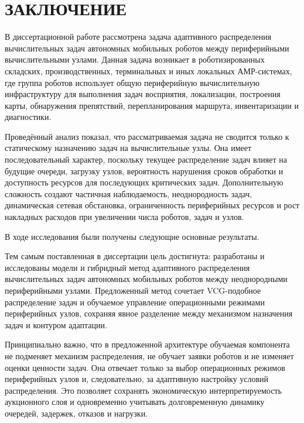 \chapter*{ЗАКЛЮЧЕНИЕ}


В диссертационной работе рассмотрена задача адаптивного распределения вычислительных задач автономных мобильных роботов между периферийными вычислительными узлами. Данная задача возникает в роботизированных складских, производственных, терминальных и иных локальных АМР-системах, где группа роботов использует общую периферийную вычислительную инфраструктуру для выполнения задач восприятия, локализации, построения карты, обнаружения препятствий, перепланирования маршрута, инвентаризации и диагностики.

Проведённый анализ показал, что рассматриваемая задача не сводится только к статическому назначению задач на вычислительные узлы. Она имеет последовательный характер, поскольку текущее распределение задач влияет на будущие очереди, загрузку узлов, вероятность нарушения сроков обработки и доступность ресурсов для последующих критических задач. Дополнительную сложность создают частичная наблюдаемость, неоднородность задач, динамическая сетевая обстановка, ограниченность периферийных ресурсов и рост накладных расходов при увеличении числа роботов, задач и узлов.

В ходе исследования были получены следующие основные результаты.



Тем самым поставленная в диссертации цель достигнута: разработаны и исследованы модели и гибридный метод адаптивного распределения вычислительных задач автономных мобильных роботов между неоднородными периферийными узлами. Предложенный метод сочетает VCG-подобное распределение задач и обучаемое управление операционными режимами периферийных узлов, сохраняя явное разделение между механизмом назначения задач и контуром адаптации.

Принципиально важно, что в предложенной архитектуре обучаемая компонента не подменяет механизм распределения, не обучает заявки роботов и не изменяет оценки ценности задач. Она отвечает только за выбор операционных режимов периферийных узлов и, следовательно, за адаптивную настройку условий распределения. Это позволяет сохранять экономическую интерпретируемость аукционного слоя и одновременно учитывать долговременную динамику очередей, задержек, отказов и нагрузки.

